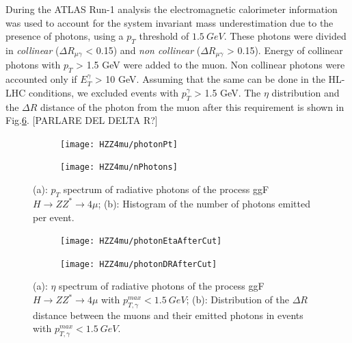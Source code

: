 \documentclass[a4paper,twoside,12pt]{article}
\begin{document}
During the ATLAS Run-1 analysis the electromagnetic calorimeter information was used
to account for the system invariant mass underestimation due to the presence of photons, 
using a $p_T$ threshold of $1.5\ GeV$\cite{HZZ4mu_run1}. These photons were divided
in \textit{collinear} ($\Delta R_{\mu\gamma}$ < 0.15) and \textit{non collinear} ($\Delta R_{\mu\gamma}$ > 0.15). 
Energy of collinear photons with $p_{T}$ > 1.5 GeV were added to the muon. Non collinear photons 
were accounted only if $E_{T}^{\gamma}$ > 10 GeV. Assuming that the same
can be done in the HL-LHC conditions, we excluded events with $p_{T}^{\gamma}$ > 1.5 GeV. The $\eta$ distribution
and the $\Delta R$ distance of the photon from the muon after this requirement is shown in Fig.\ref{fig:HZZ4mu:genPhotonsAfterCut}. [PARLARE DEL DELTA R?]\\

\begin{figure}
\centering
\begin{subfigure}{.5\textwidth}
  \centering
  \texttt{[image: HZZ4mu/photonPt]}
  \caption{}
  \label{fig:HZZ4mu:photonPt}
\end{subfigure}%
\begin{subfigure}{.5\textwidth}
  \centering
  \texttt{[image: HZZ4mu/nPhotons]}
  \caption{}
  \label{fig:HZZ4mu:nPhotons}
\end{subfigure}
\caption{(a): $p_T$ spectrum of radiative photons of the process 
	ggF $H \rightarrow ZZ^* \rightarrow 4\mu$; 
	(b): Histogram of the number of photons emitted per event.}
\label{fig:HZZ4mu:genPhotons}
\end{figure}

\begin{figure}
\centering
\begin{subfigure}{.5\textwidth}
  \centering
  \texttt{[image: HZZ4mu/photonEtaAfterCut]}
  \caption{}
  \label{fig:HZZ4mu:photonEtaAfterCut}
\end{subfigure}%
\begin{subfigure}{.5\textwidth}
  \centering
  \texttt{[image: HZZ4mu/photonDRAfterCut]}
  \caption{}
  \label{fig:HZZ4mu:photonDRAfterCut}
\end{subfigure}
\caption{(a): $\eta$ spectrum of radiative photons of the process 
	ggF $H \rightarrow ZZ^* \rightarrow 4\mu$ with $p^{max}_{T, \gamma} < 1.5\ GeV$; 
	(b): Distribution of the $\Delta R$ distance between the muons and their emitted photons in events with $p^{max}_{T, \gamma} < 1.5\ GeV$.}
\label{fig:HZZ4mu:genPhotonsAfterCut}
\end{figure}
\end{document}

